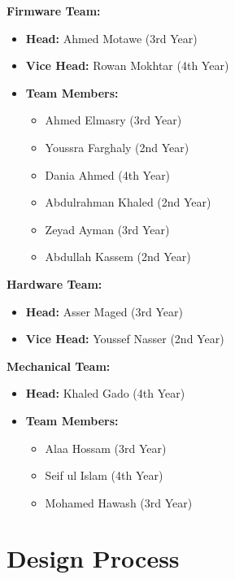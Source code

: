 \documentclass[12pt,a4paper,twocolumn]{article}
\begin{document}
\textbf{Firmware Team:}
\begin{itemize}
    \setlength{\itemsep}{1pt}
    \setlength{\parskip}{0pt}
    \setlength{\parsep}{0pt}
    \item \textbf{Head:} Ahmed Motawe (3rd Year)
    \item \textbf{Vice Head:} Rowan Mokhtar (4th Year)
    \item \textbf{Team Members:}
    \begin{itemize}
        \setlength{\itemsep}{1pt}
        \setlength{\parskip}{0pt}
        \setlength{\parsep}{0pt}
        \item Ahmed Elmasry (3rd Year)
        \item Youssra Farghaly (2nd Year)
        \item Dania Ahmed (4th Year)
        \item Abdulrahman Khaled (2nd Year)
        \item Zeyad Ayman (3rd Year)
        \item Abdullah Kassem (2nd Year)
    \end{itemize}
\end{itemize}

\textbf{Hardware Team:}
\begin{itemize}
    \setlength{\itemsep}{1pt}
    \setlength{\parskip}{0pt}
    \setlength{\parsep}{0pt}
    \item \textbf{Head:} Asser Maged (3rd Year)
    \item \textbf{Vice Head:} Youssef Nasser (2nd Year)
\end{itemize}

\textbf{Mechanical Team:}
\begin{itemize}
\setlength{\itemsep}{1pt}
    \setlength{\parskip}{0pt}
    \setlength{\parsep}{0pt}
    \item \textbf{Head:} Khaled Gado (4th Year)
    \item \textbf{Team Members:}
    \begin{itemize}
    \setlength{\itemsep}{1pt}
    \setlength{\parskip}{0pt}
    \setlength{\parsep}{0pt}
        \item Alaa Hossam (3rd Year)
        \item Seif ul Islam (4th Year)
        \item Mohamed Hawash (3rd Year)
    \end{itemize}
\end{itemize}

\section{Design Process}
\end{document}
